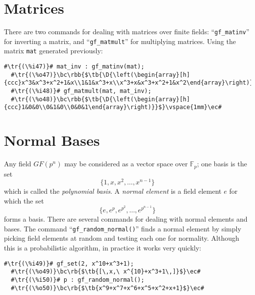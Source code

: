 \documentclass[a4paper,11pt,leqno,fleqn]{artikel3}
\newcommand{\D}{\displaystyle}
\newcommand{\bc}{\begin{center}}
\newcommand{\ec}{\end{center}}
\newcommand{\tr}[1]{\textcolor{red}{#1}}
\newcommand{\tb}[1]{\textcolor{blue}{#1}}
\newcommand{\rb}[1]{\raisebox{2mm}[0mm][1mm]{#1}}
\newcommand{\rbb}[1]{\raisebox{-4mm}[0mm][9mm]{#1}}
\begin{document}
\section*{Matrices}

There are two commands for dealing with matrices over finite fields:
``\verb!gf_matinv!'' for inverting a matrix, and ``\verb!gf_matmult!'' for
multiplying matrices.  Using the matrix \texttt{mat} generated previously:

\vspace*{2mm}
\begin{lstlisting}[escapechar=\#]
  #\tr{(\%i47)}# mat_inv : gf_matinv(mat);
  #\tr{(\%o47)}\bc\rbb{$\tb{\D{\left(\begin{array}[h]{ccc}x^3&x^3+x^2+1&x\\1&1&x^3+x\\x^3+x&x^3+x^2+1&x^2\end{array}\right)}}$}\vspace{3mm}\ec#
  #\tr{(\%i48)}# gf_matmult(mat, mat_inv);
  #\tr{(\%o48)}\bc\rbb{$\tb{\D{\left(\begin{array}[h]{ccc}1&0&0\\0&1&0\\0&0&1\end{array}\right)}}$}\vspace{1mm}\ec#
\end{lstlisting}


\section*{Normal Bases}

Any field $GF(p^n)$ may be considered as a vector space over
$\mathbb{F}_p$; one basis is the set
\[
\{1,x,x^2,\ldots,x^{n-1}\}
\]
which is called the \emph{polynomial basis}.  A \emph{normal element} is a
field element $e$ for which the set
\[
\{e,e^p,e^{p^2},\ldots,e^{p^{n-1}}\}
\]
forms a basis.  There are several commands for dealing with normal elements
and bases.  The command ``\verb!gf_random_normal()!'' finds a normal element by
simply picking field elements at random and testing each one for normality.
Although this is a probabilistic algorithm, in practice it works very quickly:

\vspace*{2mm}
\begin{lstlisting}[escapechar=\#]
  #\tr{(\%i49)}# gf_set(2, x^10+x^3+1);
  #\tr{(\%o49)}\bc\rb{$\tb{[\,x,\ x^{10}+x^3+1\,]}$}\ec#
  #\tr{(\%i50)}# p : gf_random_normal();
  #\tr{(\%o50)}\bc\rb{$\tb{x^9+x^7+x^6+x^5+x^2+x+1}$}\ec#
\end{lstlisting}
\end{document}
